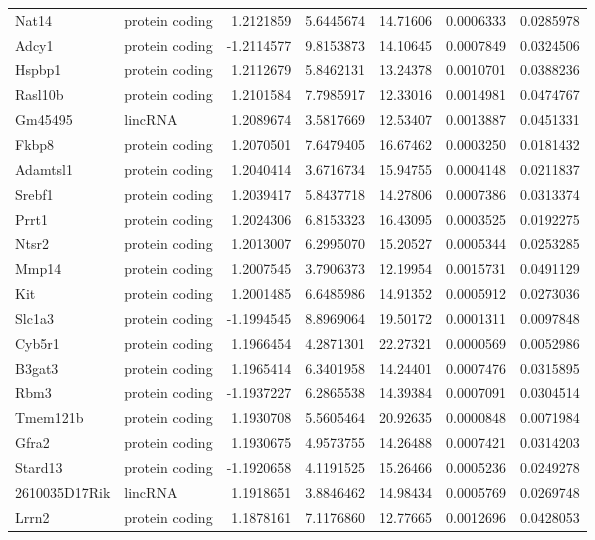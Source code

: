 \documentclass[onehalf,12pt]{beavtex}
\begin{document}
\begin{longtable}{llrrrrr}
  Nat14 & protein coding & 1.2121859 & 5.6445674 & 14.71606 & 0.0006333 & 0.0285978\\
  Adcy1 & protein coding & -1.2114577 & 9.8153873 & 14.10645 & 0.0007849 & 0.0324506\\
  Hspbp1 & protein coding & 1.2112679 & 5.8462131 & 13.24378 & 0.0010701 & 0.0388236\\
  \addlinespace
  Rasl10b & protein coding & 1.2101584 & 7.7985917 & 12.33016 & 0.0014981 & 0.0474767\\
  Gm45495 & lincRNA & 1.2089674 & 3.5817669 & 12.53407 & 0.0013887 & 0.0451331\\
  Fkbp8 & protein coding & 1.2070501 & 7.6479405 & 16.67462 & 0.0003250 & 0.0181432\\
  Adamtsl1 & protein coding & 1.2040414 & 3.6716734 & 15.94755 & 0.0004148 & 0.0211837\\
  Srebf1 & protein coding & 1.2039417 & 5.8437718 & 14.27806 & 0.0007386 & 0.0313374\\
  \addlinespace
  Prrt1 & protein coding & 1.2024306 & 6.8153323 & 16.43095 & 0.0003525 & 0.0192275\\
  Ntsr2 & protein coding & 1.2013007 & 6.2995070 & 15.20527 & 0.0005344 & 0.0253285\\
  Mmp14 & protein coding & 1.2007545 & 3.7906373 & 12.19954 & 0.0015731 & 0.0491129\\
  Kit & protein coding & 1.2001485 & 6.6485986 & 14.91352 & 0.0005912 & 0.0273036\\
  Slc1a3 & protein coding & -1.1994545 & 8.8969064 & 19.50172 & 0.0001311 & 0.0097848\\
  \addlinespace
  Cyb5r1 & protein coding & 1.1966454 & 4.2871301 & 22.27321 & 0.0000569 & 0.0052986\\
  B3gat3 & protein coding & 1.1965414 & 6.3401958 & 14.24401 & 0.0007476 & 0.0315895\\
  Rbm3 & protein coding & -1.1937227 & 6.2865538 & 14.39384 & 0.0007091 & 0.0304514\\
  Tmem121b & protein coding & 1.1930708 & 5.5605464 & 20.92635 & 0.0000848 & 0.0071984\\
  Gfra2 & protein coding & 1.1930675 & 4.9573755 & 14.26488 & 0.0007421 & 0.0314203\\
  \addlinespace
  Stard13 & protein coding & -1.1920658 & 4.1191525 & 15.26466 & 0.0005236 & 0.0249278\\
  2610035D17Rik & lincRNA & 1.1918651 & 3.8846462 & 14.98434 & 0.0005769 & 0.0269748\\
  Lrrn2 & protein coding & 1.1878161 & 7.1176860 & 12.77665 & 0.0012696 & 0.0428053\\

\end{longtable}
\end{document}
